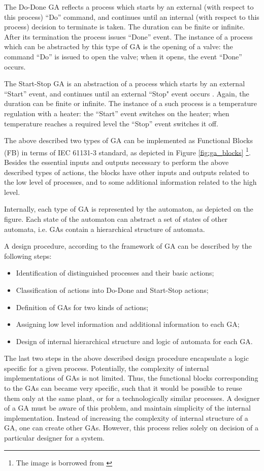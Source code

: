 The Do-Done GA reflects a process which starts by an external (with respect to
this process) ``Do'' command, and continues until an internal (with respect to
this process) decision to terminate is taken. The duration can be finite or
infinite. After its termination the process issues ``Done'' event. The 
instance of a process which can be abstracted by this type of GA is the opening
of a valve: the command ``Do'' is issued to open the valve; when it opens, the
event ``Done'' occurs.

The Start-Stop GA is an abstraction of a process which starts by an external
``Start'' event, and continues until an external ``Stop" event occurs .
Again, the duration can be finite or infinite. The instance of a such process is
a temperature regulation with a heater: the ``Start'' event switches on the
heater; when temperature reaches a required level the ``Stop'' event switches it off.

The above described two types of GA can be implemented as Functional Blocks
(FB) in terms of IEC 61131-3 standard, as depicted in Figure
\ref{fig:ga_blocks}
\footnote{The image is borrowed from \cite{faldella_hierarchical_2008}}. 
Besides the essential inputs and outputs necessary to perform the above described types of actions, the blocks have other inputs and
outputs related to the low level of processes, and to some additional
information related to the high level. 

Internally, each type of GA is represented by the automaton, as depicted on the
figure. Each state of the automaton can abstract a set of states of other
automata, i.e. GAs contain a hierarchical structure of automata.

A design procedure, according to the framework of GA can be described by the
following steps:
\begin{itemize}
  \item Identification of distinguished processes and their basic actions;
  \item Classification of actions into Do-Done and Start-Stop actions;
  \item Definition of GAs for two kinds of actions;
  \item Assigning low level information and additional information to each GA;
  \item Design of internal hierarchical structure and logic of automata for
  each GA.
\end{itemize}

The last two steps in the above described design procedure encapsulate a logic
specific for a given process. Potentially, the complexity of internal
implementations of GAs is not limited. Thus, the functional blocks
corresponding to the GAs can became very specific, such that it would be
possible to reuse them only at the same plant, or for a technologically similar
processes. A designer of a GA must be aware of this problem, and maintain
simplicity of the internal implementation. Instead of increasing the complexity
of internal structure of a GA, one can create other GAs. However, this
process relies solely on decision of a particular designer for a system.

